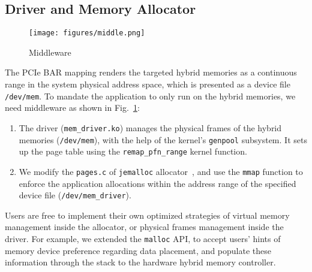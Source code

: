 \documentclass[conference]{IEEEtran}
\begin{document}
\subsection{Driver and Memory Allocator}
\begin{figure}[h]
\centerline{\texttt{[image: figures/middle.png]}}
\caption{Middleware}
\label{fig:middle}
\end{figure}
The PCIe BAR mapping renders the targeted hybrid memories as a continuous range in the system physical address space, which is presented as a device file \texttt{/dev/mem}.
To mandate the application to only run on the hybrid memories, we need middleware as shown in Fig.~\ref{fig:middle}:
\begin{enumerate}
    \item The driver (\texttt{mem\_driver.ko}) manages the physical frames of the hybrid memories (\texttt{/dev/mem}), with the help of the kernel's \texttt{genpool} subsystem. It sets up the page table using the \texttt{remap\_pfn\_range} kernel function.
   \item We modify the \texttt{pages.c} of \texttt{jemalloc} allocator~\cite{jemalloc}, and use the \texttt{mmap} function to enforce the application allocations within the address range of the specified device file (\texttt{/dev/mem\_driver}).
\end{enumerate}
Users are free to implement their own optimized strategies of virtual memory management inside the allocator, or physical frames management inside the driver. For example, we extended the \texttt{malloc} API, to accept users' hints of memory device preference regarding data placement, and populate these information through the stack to the hardware hybrid memory controller. 
\slowdown
\end{document}
